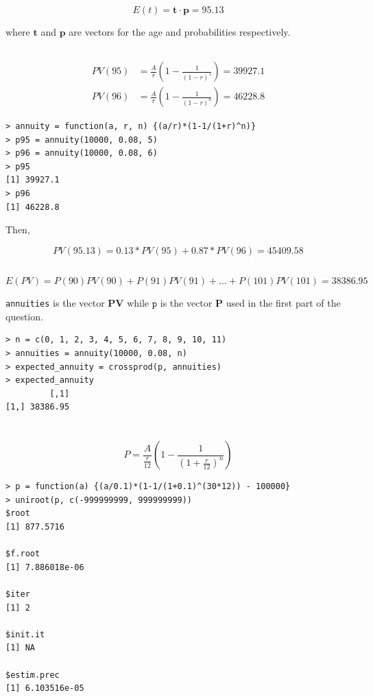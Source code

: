 \documentclass[11pt]{scrartcl}
\begin{document}
\[E(t) = \mathbf{t}\cdot\mathbf{p} = 95.13\]

where $\mathbf{t}$ and $\mathbf{p}$ are vectors for the age and probabilities respectively.

\subsection{}

\begin{align*}
PV(95) &= \frac{A}{r}\left(1-\frac{1}{(1-r)^5}\right) = 39927.1\\
PV(96) &= \frac{A}{r}\left(1-\frac{1}{(1-r)^6}\right) = 46228.8
\end{align*}

\begin{lstlisting}
> annuity = function(a, r, n) {(a/r)*(1-1/(1+r)^n)}
> p95 = annuity(10000, 0.08, 5)
> p96 = annuity(10000, 0.08, 6)
> p95
[1] 39927.1
> p96
[1] 46228.8
\end{lstlisting}

Then,

\[PV(95.13) = 0.13*PV(95) + 0.87*PV(96) = 45409.58\]

\subsection{}

\[E(PV) = P(90)PV(90) + P(91)PV(91) + ... + P(101)PV(101) = 38386.95\]

\texttt{annuities} is the vector $\mathbf{PV}$ while $\texttt{p}$ is the vector $\mathbf{P}$ used in the first part of the question.

\begin{lstlisting}
> n = c(0, 1, 2, 3, 4, 5, 6, 7, 8, 9, 10, 11)
> annuities = annuity(10000, 0.08, n)
> expected_annuity = crossprod(p, annuities)
> expected_annuity
         [,1]
[1,] 38386.95
\end{lstlisting}

\section{}

\subsection{}

\[P = \frac{A}{\frac{r}{12}}\left(1 - \frac{1}{(1+\frac{r}{12})^n}\right)\]

\begin{lstlisting}
> p = function(a) {(a/0.1)*(1-1/(1+0.1)^(30*12)) - 100000}
> uniroot(p, c(-999999999, 999999999))
$root
[1] 877.5716

$f.root
[1] 7.886018e-06

$iter
[1] 2

$init.it
[1] NA

$estim.prec
[1] 6.103516e-05
\end{lstlisting}
\end{document}
